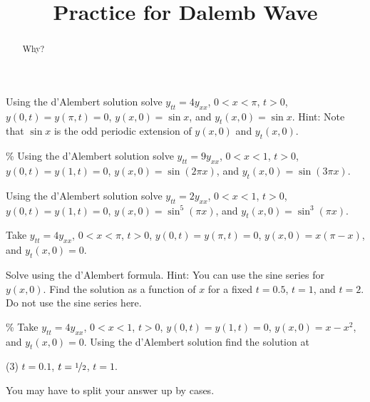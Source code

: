 \documentclass{ximera}
\title{Practice for Dalemb Wave}
\begin{document}
\begin{abstract}
Why?
\end{abstract}
\maketitle


\begin{exercise}
    Using the d'Alembert solution solve $y_{tt} = 4y_{xx}$, $0 < x < \pi$, $t > 0$, $y(0,t) = y(\pi, t) = 0$, $y(x,0) = \sin x$, and $y_t(x,0) = \sin x$.  Hint: Note that $\sin x$ is the odd periodic extension of $y(x,0)$ and $y_t(x,0)$.
\end{exercise}

\begin{exercise}\%
    Using the d'Alembert solution solve $y_{tt} = 9y_{xx}$, $0 < x < 1$, $t > 0$, $y(0,t) = y(1, t) = 0$, $y(x,0) = \sin (2 \pi x)$, and $y_t(x,0) = \sin (3 \pi x)$.
\end{exercise}

\begin{exercise}
    Using the d'Alembert solution solve $y_{tt} = 2y_{xx}$, $0 < x < 1$, $t > 0$, $y(0,t) = y(1, t) = 0$, $y(x,0) = \sin^5 (\pi x)$, and $y_t(x,0) = \sin^3 (\pi x)$.
\end{exercise}

\begin{exercise}
    Take $y_{tt} = 4y_{xx}$, $0 < x < \pi$, $t > 0$, $y(0,t) = y(\pi, t) = 0$, $y(x,0) = x(\pi-x)$, and $y_t(x,0) = 0$.
    \begin{tasks}
        \task Solve using the d'Alembert formula.  Hint: You can use the sine series for $y(x,0)$.
        \task Find the solution as a function of $x$ for a fixed $t=0.5$, $t=1$, and $t=2$.  Do not use the sine series here.
    \end{tasks}
\end{exercise}

\begin{exercise}\%
    Take $y_{tt} = 4y_{xx}$, $0 < x < 1$, $t > 0$, $y(0,t) = y(1, t) = 0$, $y(x,0) = x-x^2$, and $y_t(x,0) = 0$.  Using the d'Alembert solution find the solution at
    \begin{tasks}(3)
        \task $t=0.1$,
        \task $t=\nicefrac{1}{2}$,
        \task $t=1$.
    \end{tasks}
    You may have to split your answer up by cases.
\end{exercise}
\end{document}
